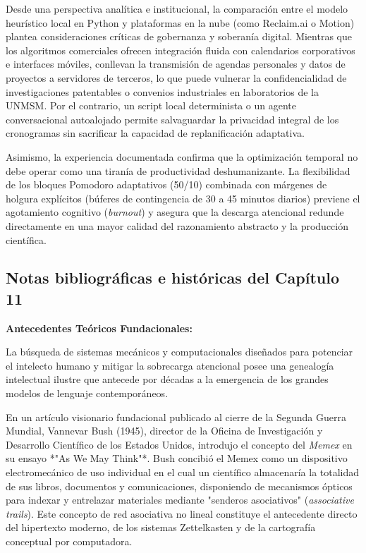 Desde una perspectiva analítica e institucional, la comparación entre el modelo heurístico local en Python y plataformas en la nube (como Reclaim.ai o Motion) plantea consideraciones críticas de gobernanza y soberanía digital. Mientras que los algoritmos comerciales ofrecen integración fluida con calendarios corporativos e interfaces móviles, conllevan la transmisión de agendas personales y datos de proyectos a servidores de terceros, lo que puede vulnerar la confidencialidad de investigaciones patentables o convenios industriales en laboratorios de la UNMSM. Por el contrario, un script local determinista o un agente conversacional autoalojado permite salvaguardar la privacidad integral de los cronogramas sin sacrificar la capacidad de replanificación adaptativa.

Asimismo, la experiencia documentada confirma que la optimización temporal no debe operar como una tiranía de productividad deshumanizante. La flexibilidad de los bloques Pomodoro adaptativos (50/10) combinada con márgenes de holgura explícitos (búferes de contingencia de 30 a 45 minutos diarios) previene el agotamiento cognitivo (\textit{burnout}) y asegura que la descarga atencional redunde directamente en una mayor calidad del razonamiento abstracto y la producción científica.

\newpage
{}
\subsection*{Notas bibliográficas e históricas del Capítulo 11}

\textbf{Antecedentes Teóricos Fundacionales:}\par\vspace{0.2cm}
La búsqueda de sistemas mecánicos y computacionales diseñados para potenciar el intelecto humano y mitigar la sobrecarga atencional posee una genealogía intelectual ilustre que antecede por décadas a la emergencia de los grandes modelos de lenguaje contemporáneos. 

En un artículo visionario fundacional publicado al cierre de la Segunda Guerra Mundial, Vannevar Bush (1945), director de la Oficina de Investigación y Desarrollo Científico de los Estados Unidos, introdujo el concepto del \textit{Memex} en su ensayo *"As We May Think"*. Bush concibió el Memex como un dispositivo electromecánico de uso individual en el cual un científico almacenaría la totalidad de sus libros, documentos y comunicaciones, disponiendo de mecanismos ópticos para indexar y entrelazar materiales mediante "senderos asociativos" (\textit{associative trails}). Este concepto de red asociativa no lineal constituye el antecedente directo del hipertexto moderno, de los sistemas Zettelkasten y de la cartografía conceptual por computadora.

